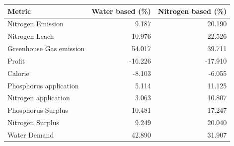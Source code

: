 \begin{tabular}{lrr}
\toprule
Metric & Water based (\%) & Nitrogen based (\%) \\
\midrule
Nitrogen Emission & 9.187 & 20.190 \\
Nitrogen Leach & 10.976 & 22.526 \\
Greenhouse Gas emission & 54.017 & 39.711 \\
Profit & -16.226 & -17.910 \\
Calorie & -8.103 & -6.055 \\
Phosphorus application & 5.114 & 11.125 \\
Nitrogen application & 3.063 & 10.807 \\
Phosphorus Surplus & 10.481 & 17.247 \\
Nitrogen Surplus & 9.249 & 20.040 \\
Water Demand & 42.890 & 31.907 \\
\bottomrule
\end{tabular}
